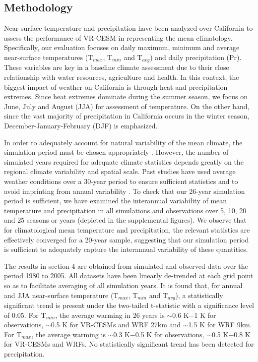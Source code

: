 \documentclass[ms,draft]{agutex}   %
\begin{document}
\begin{article}
\subsection{Methodology}

Near-surface temperature and precipitation have been analyzed over California to assess the performance of VR-CESM in representing the mean climatology. Specifically, our evaluation focuses on daily maximum, minimum and average near-surface temperatures (T$_{max}$, T$_{min}$ and T$_{avg}$) and daily precipitation (Pr). These variables are key in a baseline climate assessment due to their close relationship with water resources, agriculture and health. In this context, the biggest impact of weather on California is through heat and precipitation extremes. Since heat extremes dominate during the summer season, we focus on June, July and August (JJA) for assessment of temperature. On the other hand, since the vast majority of precipitation in California occurs in the winter season, December-January-February (DJF) is emphasized.  

In order to adequately account for natural variability of the mean climate, the simulation period must be chosen appropriately \citep{solomon2007climate}. However, the number of simulated years required for adequate climate statistics depends greatly on the regional climate variability and spatial scale. Past studies have used average weather conditions over a 30-year period to ensure sufficient statistics and to avoid imprinting from annual variability \citep{dinse2009climate}. To check that our 26-year simulation period is sufficient, we have examined the interannual variability of mean temperature and precipitation in all simulations and observations over 5, 10, 20 and 25 seasons or years (depicted in the supplemental figures). We observe that for climatological mean temperature and precipitation, the relevant statistics are effectively converged for a 20-year sample, suggesting that our simulation period is sufficient to adequately capture the interannual variability of these quantities. 


The results in section 4 are obtained from simulated and observed data over the period 1980 to 2005.  All datasets have been linearly de-trended at each grid point so as to facilitate averaging of all simulation years. It is found that, for annual and JJA near-surface temperature (T$_{max}$, T$_{min}$ and T$_{avg}$), a statistically significant trend is present under the two-tailed t-statistic with a significance level of 0.05. For T$_{min}$, the average warming in 26 years is $\sim$0.6 K$-$1 K for observations, $\sim$0.5 K for VR-CESMs and WRF 27km and $\sim$1.5 K for WRF 9km. For T$_{max}$, the average warming is $\sim$0.3 K$-$0.5 K for observations, $\sim$0.5 K$-$0.8 K for VR-CESMs and WRFs. No statistically significant trend has been detected for precipitation.


\end{article}
\end{document}
